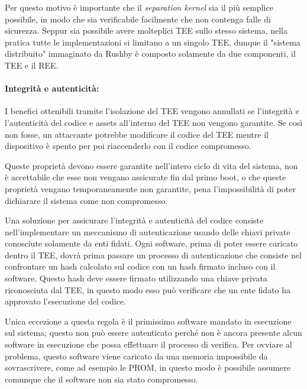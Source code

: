 \documentclass[12pt,italian]{report}
\begin{document}
Per questo motivo è importante che il \textit{separation kernel} sia
il più semplice possibile, in modo che sia verificabile facilmente che non
contenga falle di sicurezza.
Seppur sia possibile avere molteplici TEE sullo stesso sistema, nella pratica
tutte le implementazioni si limitano a un singolo TEE, dunque il
"sistema distribuito" immaginato da Rushby è composto solamente da due
componenti, il TEE e il REE.


\paragraph{Integrità e autenticità:}
I benefici ottenibili tramite l'isolazione del TEE vengono annullati se
l'integrità e l'autenticità del codice e assets all'interno del TEE non
vengono garantite. Se così non fosse, un attaccante potrebbe modificare
il codice del TEE mentre il dispositivo è spento per poi riaccenderlo con
il codice compromesso.

Queste proprietà devono essere garantite nell'intero ciclo di vita del
sistema, non è accettabile che esse non vengano assicurate fin dal primo boot,
o che queste proprietà vengano temporaneamente non garantite, pena
l'impossibilità di poter dichiarare il sistema come non compromesso.

Una soluzione per assicurare l'integrità e autenticità del codice consiste
nell'implementare un meccanismo di autenticazione usando delle chiavi
private conosciute solamente da enti fidati.
Ogni software, prima di poter essere caricato dentro il TEE, dovrà prima
passare un processo di autenticazione che consiste nel confrontare un hash
calcolato sul codice con un hash firmato incluso con il software.
Questo hash deve essere firmato utilizzando una chiave privata riconosciuta
dal TEE, in questo modo esso può verificare che un ente fidato ha approvato
l'esecuzione del codice.

Unica eccezione a questa regola è il primissimo software mandato in esecuzione
sul sistema; questo non può essere autenticato perché non è ancora presente
alcun software in esecuzione che possa effettuare il processo di verifica.
Per ovviare al problema, questo software viene caricato da una memoria
impossibile da sovrascrivere, come ad esempio le PROM, in questo modo è
possibile assumere comunque che il software non sia stato compromesso.
\end{document}
